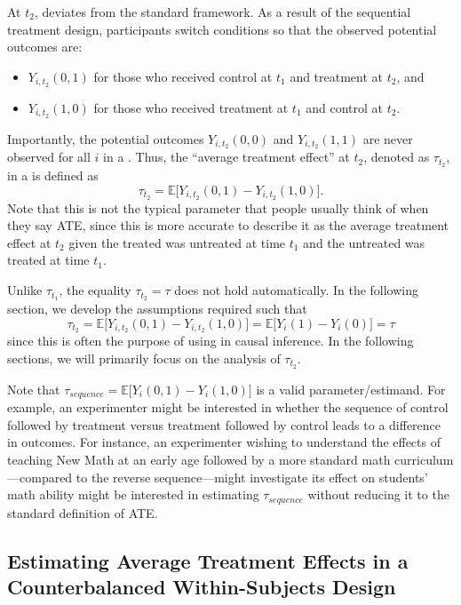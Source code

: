 At $t_2$, \cwsd{} deviates from the standard framework. As a result of the sequential treatment design, participants switch conditions so that the observed potential outcomes are:
\begin{itemize}
    \item $Y_{i,t_2}(0,1)$ for those who received control at $t_1$ and treatment at $t_2$, and 
    \item $Y_{i,t_2}(1,0)$ for those who received treatment at $t_1$ and control at $t_2$.
\end{itemize}
Importantly, the potential outcomes $Y_{i,t_2}(0,0)$ and $Y_{i,t_2}(1,1)$ are never observed for all $i$ in a \cwsd{}. Thus, the ``average treatment effect'' at $t_2$, denoted as $\tau_{t_2}$, in a \cwsd{} is defined as
\[
\tau_{t_2} = \mathbb{E}\big[ Y_{i,t_2}(0,1) - Y_{i,t_2}(1,0) \big].
\] 
Note that this is not the typical parameter that people usually think of when they say ATE, since this is more accurate to describe it as the average treatment effect at $t_2$ given the treated was untreated at time $t_1$ and the untreated was treated at time $t_1$.

Unlike $\tau_{t_1}$, the equality $\tau_{t_2} = \tau$ does not hold automatically. In the following section, we develop the assumptions required such that 
\[
\tau_{t_2} = \mathbb{E}\big[ Y_{i,t_2}(0,1) - Y_{i,t_2}(1,0) \big] = \mathbb{E}\big[ Y_{i}(1) - Y_{i}(0) \big] = \tau
\]
since this is often the purpose of using \cwsd{} in causal inference. In the following sections, we will primarily focus on the analysis of $\tau_{t_2}$.

\begin{remark}
    Note that $\tau_{sequence} = \mathbb{E}\big[ Y_{i}(0,1) - Y_{i}(1,0) \big]$ is a valid parameter/estimand. For example, an experimenter might be interested in whether the sequence of control followed by treatment versus treatment followed by control leads to a difference in outcomes. For instance, an experimenter wishing to understand the effects of teaching New Math at an early age followed by a more standard math curriculum—compared to the reverse sequence—might investigate its effect on students' math ability might be interested in estimating $\tau_{sequence}$ without reducing it to the standard definition of ATE.
\end{remark}


\subsection{Estimating Average Treatment Effects in a Counterbalanced Within-Subjects Design}


